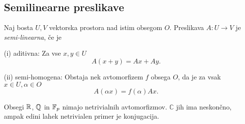 \subsection{Semilinearne preslikave}

\begin{definicija}
    Naj bosta $U, V$ vektorska prostora nad istim obsegom $O$. Preslikava $A: U \to V$ je \emph{semi-linearna}, če je

    (i) aditivna: Za vse $x,y \in U$
    \[
    A(x + y) = Ax + Ay.    
    \]

    (ii) semi-homogena: Obstaja nek avtomorfizem $f$ obsega $O$, da je za vsak $x \in U, \alpha \in O$
    \[
    A(\alpha x) = f(\alpha) Ax.
    \]
\end{definicija}

\begin{opomba}
    Obsegi $\mathbb{R}$, $\mathbb{Q}$ in $\mathbb{F}_p$ nimajo netrivialnih avtomorfizmov. $\mathbb{C}$ jih ima neskončno, ampak edini lahek netrivialen primer je konjugacija.
\end{opomba}